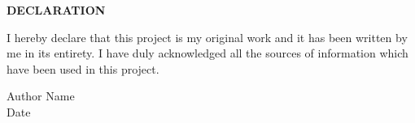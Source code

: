 \begin{center}
    {\large \textbf{DECLARATION}}
\end{center}

\vspace{3cm}

\begin{center}
    I hereby declare that this project is my original work and it has
    been written by me in its entirety. I have duly
    acknowledged all the sources of information which have
    been used in this project.

    \vspace{4cm}

    Author Name\\
    Date
\end{center}

\thispagestyle{plain}
\clearpage
